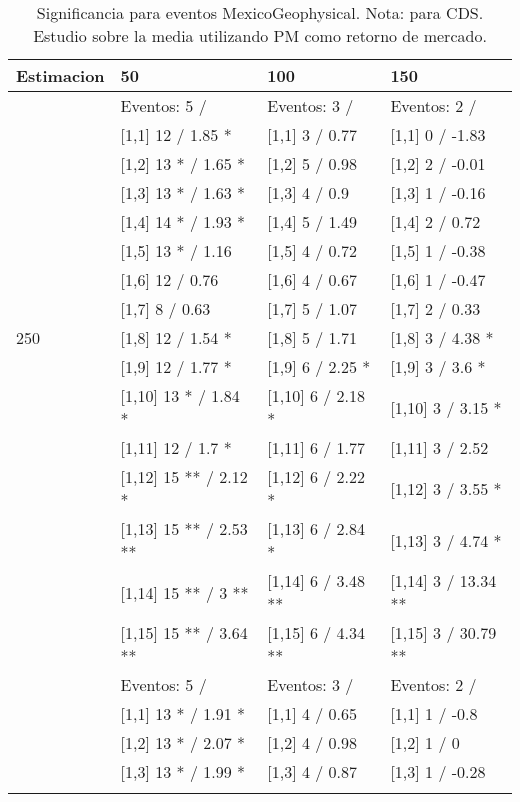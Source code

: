 \begin{table}

\caption{Significancia para eventos MexicoGeophysical. Nota: para CDS. Estudio sobre la media utilizando PM como retorno de mercado.}
\centering
\begin{tabular}[t]{llll}
\toprule
Estimacion & 50 & 100 & 150\\
\midrule
 & Eventos:  5 / & Eventos:  3 / & Eventos:  2 /\\
 & {}[1,1] 12  / 1.85 * & {}[1,1] 3  / 0.77 & {}[1,1] 0  / -1.83\\
 & {}[1,2] 13 * / 1.65 * & {}[1,2] 5  / 0.98 & {}[1,2] 2  / -0.01\\
 & {}[1,3] 13 * / 1.63 * & {}[1,3] 4  / 0.9 & {}[1,3] 1  / -0.16\\
 & {}[1,4] 14 * / 1.93 * & {}[1,4] 5  / 1.49 & {}[1,4] 2  / 0.72\\
\addlinespace
 & {}[1,5] 13 * / 1.16 & {}[1,5] 4  / 0.72 & {}[1,5] 1  / -0.38\\
 & {}[1,6] 12  / 0.76 & {}[1,6] 4  / 0.67 & {}[1,6] 1  / -0.47\\
 & {}[1,7] 8  / 0.63 & {}[1,7] 5  / 1.07 & {}[1,7] 2  / 0.33\\
250 & {}[1,8] 12  / 1.54 * & {}[1,8] 5  / 1.71 & {}[1,8] 3  / 4.38 *\\
 & {}[1,9] 12  / 1.77 * & {}[1,9] 6  / 2.25 * & {}[1,9] 3  / 3.6 *\\
\addlinespace
 & {}[1,10] 13 * / 1.84 * & {}[1,10] 6  / 2.18 * & {}[1,10] 3  / 3.15 *\\
 & {}[1,11] 12  / 1.7 * & {}[1,11] 6  / 1.77 & {}[1,11] 3  / 2.52\\
 & {}[1,12] 15 ** / 2.12 * & {}[1,12] 6  / 2.22 * & {}[1,12] 3  / 3.55 *\\
 & {}[1,13] 15 ** / 2.53 ** & {}[1,13] 6  / 2.84 * & {}[1,13] 3  / 4.74 *\\
 & {}[1,14] 15 ** / 3 ** & {}[1,14] 6  / 3.48 ** & {}[1,14] 3  / 13.34 **\\
\addlinespace
 & {}[1,15] 15 ** / 3.64 ** & {}[1,15] 6  / 4.34 ** & {}[1,15] 3  / 30.79 **\\
 & Eventos:  5 / & Eventos:  3 / & Eventos:  2 /\\
 & {}[1,1] 13 * / 1.91 * & {}[1,1] 4  / 0.65 & {}[1,1] 1  / -0.8\\
 & {}[1,2] 13 * / 2.07 * & {}[1,2] 4  / 0.98 & {}[1,2] 1  / 0\\
 & {}[1,3] 13 * / 1.99 * & {}[1,3] 4  / 0.87 & {}[1,3] 1  / -0.28\\
\addlinespace

\end{tabular}
\end{table}
